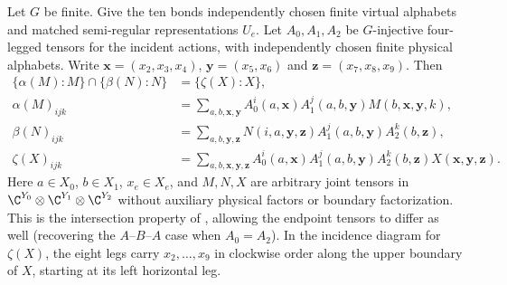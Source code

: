 \begin{lemma}%
    \label{thm:peps_general_three_block_intersection}
    \leanok
    Let $G$ be finite. Give the ten bonds independently chosen finite
    virtual alphabets and matched semi-regular representations $U_e$.
    Let $A_0,A_1,A_2$ be $G$-injective four-legged tensors for the incident
    actions, with independently chosen finite physical alphabets. Write
    $\mathbf x=(x_2,x_3,x_4)$, $\mathbf y=(x_5,x_6)$ and
    $\mathbf z=(x_7,x_8,x_9)$. Then
    \begin{align}
        \{\alpha(M):M\}\cap\{\beta(N):N\}
         & =\{\zeta(X):X\},
        \label{eq:peps_general_three_block_intersection} \\
        \alpha(M)_{ijk}
         & =\sum_{a,b,\mathbf x,\mathbf y}
        A_0^i(a,\mathbf x)A_1^j(a,b,\mathbf y)
        M(b,\mathbf x,\mathbf y,k),\nonumber             \\
        \beta(N)_{ijk}
         & =\sum_{a,b,\mathbf y,\mathbf z}
        N(i,a,\mathbf y,\mathbf z)A_1^j(a,b,\mathbf y)
        A_2^k(b,\mathbf z),\nonumber                     \\
        \zeta(X)_{ijk}
         & =\sum_{a,b,\mathbf x,\mathbf y,\mathbf z}
        A_0^i(a,\mathbf x)A_1^j(a,b,\mathbf y)
        A_2^k(b,\mathbf z)X(\mathbf x,\mathbf y,\mathbf z).\nonumber
    \end{align}
    Here $a\in X_0$, $b\in X_1$, $x_e\in X_e$, and $M,N,X$ are arbitrary
    joint tensors in $\C^{Y_0}\otimes\C^{Y_1}\otimes\C^{Y_2}$ without
    auxiliary physical factors or boundary factorization.
    This is the intersection property of
    \cite[Theorem~5.4]{Schuch2010PEPS}, allowing the endpoint tensors to
    differ as well (recovering the $A$--$B$--$A$ case when $A_0=A_2$).
    In the incidence diagram for $\zeta(X)$, the eight legs carry
    $x_2,\ldots,x_9$ in clockwise order along the upper boundary of $X$,
    starting at its left horizontal leg.

\end{lemma}
